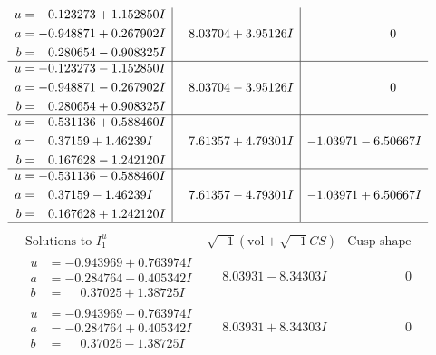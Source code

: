 \documentclass[1p]{elsarticle_modified}
\theoremstyle{definition}
\newcommand{\I}{\sqrt{-1}}
\begin{document}
$$\begin{array}{c|c|c}
\begin{aligned}
u &= -0.123273 + 1.152850 I \\
a &= -0.948871 + 0.267902 I \\
b &= \phantom{-}0.280654 - 0.908325 I\end{aligned}
 & \phantom{-}8.03704 + 3.95126 I & \phantom{-0.000000 } 0 \\ \hline\begin{aligned}
u &= -0.123273 - 1.152850 I \\
a &= -0.948871 - 0.267902 I \\
b &= \phantom{-}0.280654 + 0.908325 I\end{aligned}
 & \phantom{-}8.03704 - 3.95126 I & \phantom{-0.000000 } 0 \\ \hline\begin{aligned}
u &= -0.531136 + 0.588460 I \\
a &= \phantom{-}0.37159 + 1.46239 I \\
b &= \phantom{-}0.167628 - 1.242120 I\end{aligned}
 & \phantom{-}7.61357 + 4.79301 I & -1.03971 - 6.50667 I \\ \hline\begin{aligned}
u &= -0.531136 - 0.588460 I \\
a &= \phantom{-}0.37159 - 1.46239 I \\
b &= \phantom{-}0.167628 + 1.242120 I\end{aligned}
 & \phantom{-}7.61357 - 4.79301 I & -1.03971 + 6.50667 I\\
 \hline 
 \end{array}$$\newpage$$\begin{array}{c|c|c}  
\text{Solutions to }I^u_{1}& \I (\text{vol} + \sqrt{-1}CS) & \text{Cusp shape}\\
 \hline 
\begin{aligned}
u &= -0.943969 + 0.763974 I \\
a &= -0.284764 - 0.405342 I \\
b &= \phantom{-}0.37025 + 1.38725 I\end{aligned}
 & \phantom{-}8.03931 - 8.34303 I & \phantom{-0.000000 } 0 \\ \hline\begin{aligned}
u &= -0.943969 - 0.763974 I \\
a &= -0.284764 + 0.405342 I \\
b &= \phantom{-}0.37025 - 1.38725 I\end{aligned}
 & \phantom{-}8.03931 + 8.34303 I & \phantom{-0.000000 } 0 \\ \hline\begin{aligned}

\end{aligned}
\end{array}$$
\end{document}
